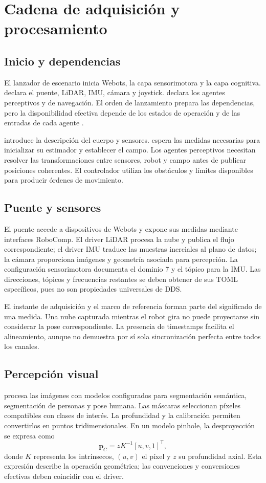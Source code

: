 \section{Cadena de adquisición y procesamiento}
\subsection{Inicio y dependencias}
El lanzador de escenario inicia Webots, la capa sensorimotora y la capa cognitiva.  declara el puente, LiDAR, IMU, cámara y joystick.  declara los agentes perceptivos y de navegación. El orden de lanzamiento prepara las dependencias, pero la disponibilidad efectiva depende de los estados de operación y de las entradas de cada agente \cite{launch}.

 introduce la descripción del cuerpo y sensores.  espera las medidas necesarias para inicializar su estimador y establecer el campo. Los agentes perceptivos necesitan resolver las transformaciones entre sensores, robot y campo antes de publicar posiciones coherentes. El controlador utiliza los obstáculos y límites disponibles para producir órdenes de movimiento.

\subsection{Puente y sensores}
El puente accede a dispositivos de Webots y expone sus medidas mediante interfaces RoboComp. El driver LiDAR procesa la nube y publica el flujo correspondiente; el driver IMU traduce las muestras inerciales al plano de datos; la cámara proporciona imágenes y geometría asociada para percepción. La configuración sensorimotora documenta el dominio 7 y el tópico  para la IMU. Las direcciones, tópicos y frecuencias restantes se deben obtener de sus TOML específicos, pues no son propiedades universales de DDS.

El instante de adquisición y el marco de referencia forman parte del significado de una medida. Una nube capturada mientras el robot gira no puede proyectarse sin considerar la pose correspondiente. La presencia de timestamps facilita el alineamiento, aunque no demuestra por sí sola sincronización perfecta entre todos los canales.

\subsection{Percepción visual}
 procesa las imágenes con modelos configurados para segmentación semántica, segmentación de personas y pose humana. Las máscaras seleccionan píxeles compatibles con clases de interés. La profundidad y la calibración permiten convertirlos en puntos tridimensionales. En un modelo pinhole, la desproyección se expresa como
\begin{equation}
\mathbf p_C=zK^{-1}[u,v,1]^\mathsf T,
\end{equation}
donde $K$ representa los intrínsecos, $(u,v)$ el píxel y $z$ su profundidad axial. Esta expresión describe la operación geométrica; las convenciones y conversiones efectivas deben coincidir con el driver.

